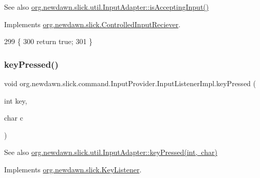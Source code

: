 \begin{DoxySeeAlso}{See also}
\mbox{\hyperlink{classorg_1_1newdawn_1_1slick_1_1util_1_1_input_adapter_a8f20e7fc464c8f8f7a676b041e691765}{org.\+newdawn.\+slick.\+util.\+Input\+Adapter\+::is\+Accepting\+Input()}} 
\end{DoxySeeAlso}


Implements \mbox{\hyperlink{interfaceorg_1_1newdawn_1_1slick_1_1_controlled_input_reciever_a380186fb0c34c11c212b72fae8186dc7}{org.\+newdawn.\+slick.\+Controlled\+Input\+Reciever}}.


\begin{DoxyCode}
299                                           \{
300             \textcolor{keywordflow}{return} \textcolor{keyword}{true};
301         \}
\end{DoxyCode}
\mbox{\label{classorg_1_1newdawn_1_1slick_1_1command_1_1_input_provider_1_1_input_listener_impl_a30a8b0de54af136b1579b3ec4c71f16b}} 
\subsubsection{\texorpdfstring{key\+Pressed()}{keyPressed()}}
{\footnotesize\ttfamily void org.\+newdawn.\+slick.\+command.\+Input\+Provider.\+Input\+Listener\+Impl.\+key\+Pressed (\begin{DoxyParamCaption}\item[{int}]{key,  }\item[{char}]{c }\end{DoxyParamCaption})\hspace{0.3cm}{\ttfamily [inline]}}

\begin{DoxySeeAlso}{See also}
\mbox{\hyperlink{classorg_1_1newdawn_1_1slick_1_1util_1_1_input_adapter_a3178218deea8aa330edf5e5c3699addc}{org.\+newdawn.\+slick.\+util.\+Input\+Adapter\+::key\+Pressed(int, char)}} 
\end{DoxySeeAlso}


Implements \mbox{\hyperlink{interfaceorg_1_1newdawn_1_1slick_1_1_key_listener_ac0b0568a21ef486c4f51382614c196ef}{org.\+newdawn.\+slick.\+Key\+Listener}}.


